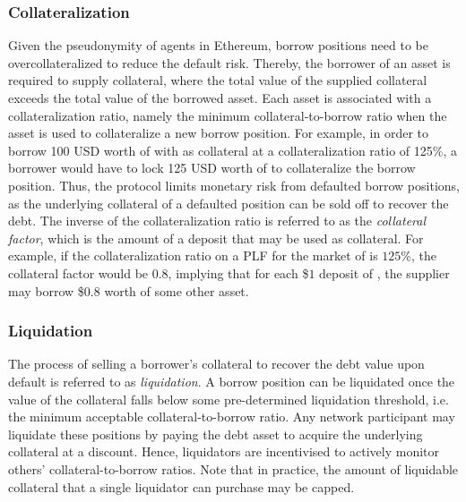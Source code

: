 \subsubsection{Collateralization}
Given the pseudonymity of agents in Ethereum, borrow positions need to be overcollateralized to reduce the default risk.
Thereby, the borrower of an asset is required to supply collateral, where the total value of the supplied collateral exceeds the total value of the borrowed asset.
Each asset is associated with a collateralization ratio, namely the minimum collateral-to-borrow ratio when the asset is used to collateralize a new borrow position.
For example, in order to borrow 100 USD worth of  with  as collateral at a collateralization ratio of 125\%, a borrower would have to lock 125 USD worth of  to collateralize the borrow position.
Thus, the protocol limits monetary risk from defaulted borrow positions, as the underlying collateral of a defaulted position can be sold off to recover the debt.
The inverse of the collateralization ratio is referred to as the \textit{collateral factor}, which is the amount of a deposit that may be used as collateral.
For example, if the collateralization ratio on a PLF for the market of  is $125$\%, the collateral factor would be $0.8$, implying that for each \$$1$ deposit of , the supplier may borrow \$$0.8$ worth of some other asset.

\subsubsection{Liquidation}
The process of selling a borrower's collateral to recover the debt value upon default is referred to as \textit{liquidation}.
A borrow position can be liquidated once the value of the collateral falls below some pre-determined liquidation threshold, i.e. the minimum acceptable collateral-to-borrow ratio.
Any network participant may liquidate these positions by paying the debt asset to acquire the underlying collateral at a discount.
Hence, liquidators are incentivised to actively monitor others' collateral-to-borrow ratios. 
Note that in practice, the amount of liquidable collateral that a single liquidator can purchase may be capped.  

